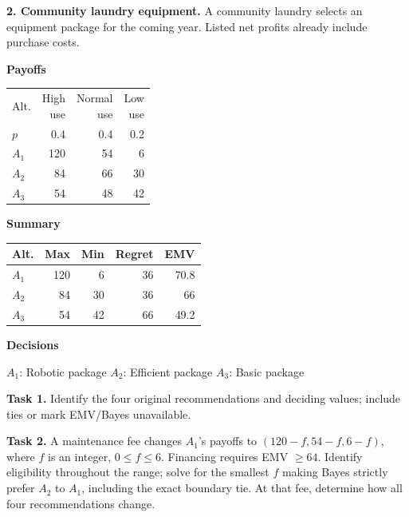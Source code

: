 \begin{studentproblem}
\textbf{2. Community laundry equipment.} A community laundry selects an equipment package for the coming year. Listed net profits already include purchase costs.
\begin{center}
	\begingroup
	\normalsize
	\setlength{\tabcolsep}{2.5pt}
	\renewcommand{\arraystretch}{1.1}
	
	\begin{minipage}[t]{0.31\linewidth}
		\centering
		\textbf{Payoffs}\par\vspace{2pt}
		\begin{tabular}{@{}lrrr@{}}\toprule Alt. & \shortstack{High\\use} & \shortstack{Normal\\use} & \shortstack{Low\\use}\\
$p$ & 0.4 & 0.4 & 0.2\\
\midrule
$A_1$ & 120 & 54 & 6\\
$A_2$ & 84 & 66 & 30\\
$A_3$ & 54 & 48 & 42\\
\bottomrule\end{tabular}
	\end{minipage}%
	\hfill
	\begin{minipage}[t]{0.33\linewidth}
		\centering
		\textbf{Summary}\par\vspace{2pt}
		\begin{tabular}{@{}lrrrr@{}}\toprule Alt. & Max & Min & Regret & EMV\\\midrule
$A_1$ & 120 & 6 & 36 & 70.8\\
$A_2$ & 84 & 30 & 36 & 66\\
$A_3$ & 54 & 42 & 66 & 49.2\\
\bottomrule\end{tabular}
	\end{minipage}%
	\hfill
	\begin{minipage}[t]{0.32\linewidth}
		\centering
		\textbf{Decisions}\par\vspace{2pt}
		\choices
	\end{minipage}
	
	\vspace{2mm}
	\footnotesize
	$A_1$: Robotic package \quad
	$A_2$: Efficient package \quad
	$A_3$: Basic package
	\endgroup
\end{center}
\textbf{Task 1.} Identify the four original recommendations and deciding values; include ties or mark EMV/Bayes unavailable.

\textbf{Task 2.} A maintenance fee changes $A_1$'s payoffs to $(120-f,54-f,6-f)$, where $f$ is an integer, $0\leq f\leq6$. Financing requires EMV $\geq64$. Identify eligibility throughout the range; solve for the smallest $f$ making Bayes strictly prefer $A_2$ to $A_1$, including the exact boundary tie. At that fee, determine how all four recommendations change.
\tasktwobox
\end{studentproblem}

